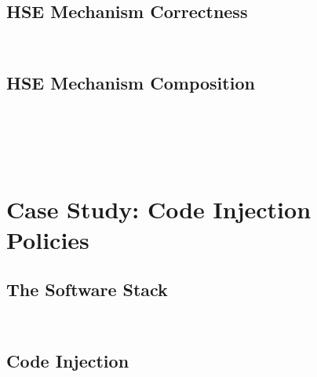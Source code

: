 \inputminted[gobble=2,firstline=147,lastline=156]{coq}{Listings/SpecCert.v}

\inputminted[gobble=2,firstline=158,lastline=182]{coq}{Listings/SpecCert.v}

\inputminted[gobble=2,firstline=184,lastline=229]{coq}{Listings/SpecCert.v}

\subsection{HSE Mechanism Correctness}

\inputminted[gobble=2,firstline=231,lastline=236]{coq}{Listings/SpecCert.v}

\inputminted[gobble=2,firstline=238,lastline=260]{coq}{Listings/SpecCert.v}

\subsection{HSE Mechanism Composition}

\inputminted[gobble=2,firstline=401,lastline=407]{coq}{Listings/SpecCert.v}

\inputminted[gobble=2,firstline=409,lastline=422]{coq}{Listings/SpecCert.v}

\inputminted[gobble=2,firstline=423,lastline=427]{coq}{Listings/SpecCert.v}

\inputminted[gobble=2,firstline=428,lastline=443]{coq}{Listings/SpecCert.v}

\inputminted[gobble=2,firstline=471,lastline=511]{coq}{Listings/SpecCert.v}

\inputminted[gobble=2,firstline=513,lastline=536]{coq}{Listings/SpecCert.v}

\section{Case Study: Code Injection Policies}

\subsection{The Software Stack}

\inputminted[gobble=2,firstline=262,lastline=269]{coq}{Listings/SpecCert.v}

\inputminted[gobble=2,firstline=271,lastline=272]{coq}{Listings/SpecCert.v}

\subsection{Code Injection}

